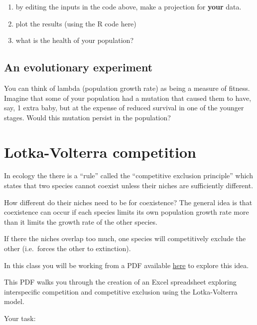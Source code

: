 \documentclass[
  a4paper]{book}
\providecommand{\tightlist}{%
  \setlength{\itemsep}{0pt}\setlength{\parskip}{0pt}}
\begin{document}
\begin{enumerate}
\def\labelenumi{\arabic{enumi})}
\tightlist
\item
  by editing the inputs in the code above, make a projection for
  \textbf{your} data.
\item
  plot the results (using the R code here)
\item
  what is the health of your population?
\end{enumerate}

\hypertarget{an-evolutionary-experiment}{%
\section{An evolutionary experiment}\label{an-evolutionary-experiment}}

You can think of lambda (population growth rate) as being a measure of
fitness. Imagine that some of your population had a mutation that caused
them to have, say, 1 extra baby, but at the expense of reduced survival
in one of the younger stages. Would this mutation persist in the
population?

\hypertarget{lotka-volterra-competition}{%
\chapter{Lotka-Volterra competition}\label{lotka-volterra-competition}}

In ecology the there is a ``rule'' called the ``competitive exclusion
principle'' which states that two species cannot coexist unless their
niches are sufficiently different.

How different do their niches need to be for coexistence? The general
idea is that coexistence can occur if each species limits its own
population growth rate more than it limits the growth rate of the other
species.

If there the niches overlap too much, one species will competitively
exclude the other (i.e.~forces the other to extinction).

In this class you will be working from a PDF available
\href{https://www.dropbox.com/s/oukr39oq0rsn8il/9.\%20Interspecific\%20Competition\%20and\%20Competitive\%20Exclusion.pdf?dl=1}{here}
to explore this idea.

This PDF walks you through the creation of an Excel spreadsheet
exploring interspecific competition and competitive exclusion using the
Lotka-Volterra model.

Your task:
\end{document}
